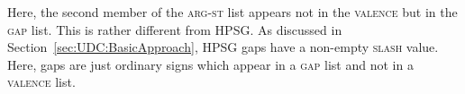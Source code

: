 \documentclass[output=paper
                ,modfonts
                ,nonflat
	        ,collection
	        ,collectionchapter
	        ,collectiontoclongg
 	        ,biblatex
                ,babelshorthands
                ,newtxmath
                ,draftmode
                ,colorlinks, citecolor=brown
]{./langsci/langscibook}
\begin{document}
{\begin{exe}
\end{exe}
	
\noindent
Here, the second member of the \textsc{arg-st} list appears not in the \textsc{valence} but in the \textsc{gap} list. This is rather different from HPSG. As discussed in Section~\ref{sec:UDC:BasicApproach}, HPSG gaps have a non-empty \textsc{slash} value. Here, gaps are just ordinary signs which appear in a \textsc{gap} list and not in a \textsc{valence} list.













 

{\sloppy
\printbibliography[heading=subbibliography,notkeyword=this]
}


}
\end{document}

